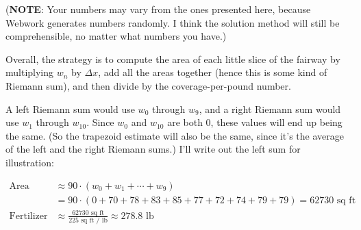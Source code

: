 \documentclass[10pt]{article}
\newenvironment{red}{\color{red}}{\ignorespacesafterend}
\begin{document}
\begin{enumerate}[leftmargin=0pt]
\begin{red}
(\textbf{NOTE}: Your numbers may vary from the ones presented here, because Webwork generates numbers randomly. I think the solution method will still be comprehensible, no matter what numbers you have.)

Overall, the strategy is to compute the area of each little slice of the fairway by multiplying $w_n$ by $\Delta x$, add all the areas together (hence this is some kind of Riemann sum), and then divide by the coverage-per-pound number. 

A left Riemann sum would use $w_0$ through $w_9$, and a right Riemann sum would use $w_1$ through $w_{10}$. Since $w_0$ and $w_{10}$ are both $0$, these values will end up being the same. (So the trapezoid estimate will also be the same, since it's the average of the left and the right Riemann sums.) I'll write out the left sum for illustration:

\begin{align*}
    \textrm{Area} &\approx 90\cdot (w_0 + w_1 + \cdots + w_9) \\
    &= 90\cdot(0+70+78+83+85+77+72+74+79+79) = 62730\textrm{ sq ft} \\
   \textrm{Fertilizer} &\approx \frac{62730 \textrm{ sq ft}}{225\textrm{ sq ft / lb}} \approx 278.8 \textrm{ lb}
\end{align*}
\end{red}


\end{enumerate}
\end{document}

